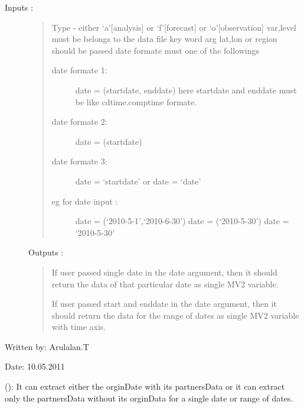 \documentclass[letterpaper,10pt,english]{sphinxmanual}
\begin{document}
\begin{fulllineitems}
\begin{fulllineitems}
\begin{description}
\item[{Inputs :}] \leavevmode\begin{quote}

Type - either `a'{[}analysis{]} or `f'{[}forecast{]} or `o'{[}observation{]}
var,level must be belongs to the data file
key word arg lat,lon or region should be passed
date formate must one of the followings
\begin{description}
\item[{date formate 1:}] \leavevmode
date = (startdate, enddate)
here startdate and enddate must be like cdtime.comptime formate.

\item[{date formate 2:}] \leavevmode
date = (startdate)

\item[{date formate 3:}] \leavevmode
date = `startdate' or date = `date'

\item[{eg for date input :}] \leavevmode
date = (`2010-5-1',`2010-6-30')
date = (`2010-5-30')
date = `2010-5-30'

\end{description}
\end{quote}

Outputs :
\begin{quote}

If user passed single date in the date argument, then it should
return the data of that particular date as single MV2 variable.

If user passed start and enddate in the date argument,
then it should return the data for the range of dates as
single MV2 variable with time axis.
\end{quote}

\end{description}

Written by: Arulalan.T

Date: 10.05.2011

\end{fulllineitems}


\begin{fulllineitems}
\label{diagnosisutils:xml_data_access.GribXmlAccess.getDataPartners}
{\hyperref[diagnosisutils:xml_data_access.GribXmlAccess.getDataPartners]{}} (): It can extract either the orginDate with its
partnersData or it can extract only the partnersData without its
orginData for a single date or range of dates.


\end{fulllineitems}
\end{fulllineitems}
\end{document}
